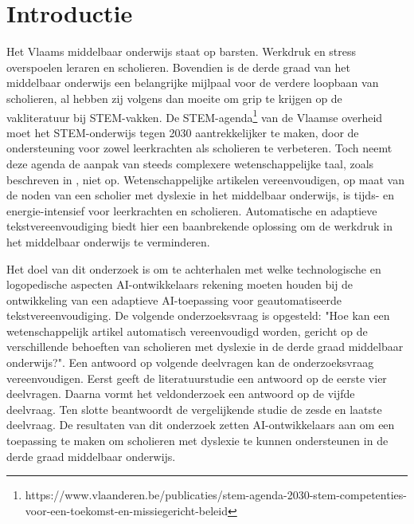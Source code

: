 
\section{Introductie}%
\label{sec:introductie}


Het Vlaams middelbaar onderwijs staat op barsten. Werkdruk en stress overspoelen leraren en scholieren. Bovendien is de derde graad van het middelbaar onderwijs een belangrijke mijlpaal voor de verdere loopbaan van scholieren, al hebben zij volgens \textcite{Dapaah2022} dan moeite om grip te krijgen op de vakliteratuur bij STEM-vakken. De STEM-agenda\footnote{https://www.vlaanderen.be/publicaties/stem-agenda-2030-stem-competenties-voor-een-toekomst-en-missiegericht-beleid} van de Vlaamse overheid moet het STEM-onderwijs tegen 2030 aantrekkelijker te maken, door de ondersteuning voor zowel leerkrachten als scholieren te verbeteren. Toch neemt deze agenda de aanpak van steeds complexere wetenschappelijke taal, zoals beschreven in \textcite{Barnett2020}, niet op. Wetenschappelijke artikelen vereenvoudigen, op maat van de noden van een scholier met dyslexie in het middelbaar onderwijs, is tijds- en energie-intensief voor leerkrachten en scholieren. Automatische en adaptieve tekstvereenvoudiging biedt hier een baanbrekende oplossing om de werkdruk in het middelbaar onderwijs te verminderen.

Het doel van dit onderzoek is om te achterhalen met welke technologische en logopedische aspecten AI-ontwikkelaars rekening moeten houden bij de ontwikkeling van een adaptieve AI-toepassing voor geautomatiseerde tekstvereenvoudiging. De volgende onderzoeksvraag is opgesteld: "Hoe kan een wetenschappelijk artikel automatisch vereenvoudigd worden, gericht op de verschillende behoeften van scholieren met dyslexie in de derde graad middelbaar onderwijs?". Een antwoord op volgende deelvragen kan de onderzoeksvraag vereenvoudigen. Eerst geeft de literatuurstudie een antwoord op de eerste vier deelvragen. Daarna vormt het veldonderzoek een antwoord op de vijfde deelvraag. Ten slotte beantwoordt de vergelijkende studie de zesde en laatste deelvraag. De resultaten van dit onderzoek zetten AI-ontwikkelaars aan om een toepassing te maken om scholieren met dyslexie te kunnen ondersteunen in de derde graad middelbaar onderwijs.

